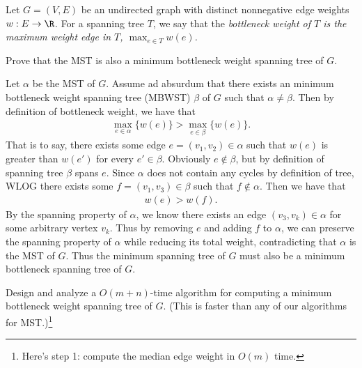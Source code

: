 \documentclass{article}
\begin{document}
 Let \( G=(V,E) \) be an undirected graph with distinct nonnegative edge weights \( w:E\to\R \).
For a spanning tree \( T \), we say that the \it{bottleneck weight of \( T \)} is the maximum weight edge in \( T \), \( \max_{e\in T} w(e) \).
\setcounter{section}{16}
\setcounter{exercise}{6}
\begin{subexercise}
Prove that the MST is also a minimum bottleneck weight spanning tree of \( G \).
\end{subexercise}
\begin{solution}
  Let \( \alpha \) be the MST of \( G \).
  Assume ad absurdum that there exists an minimum bottleneck weight spanning tree (MBWST) \( \beta \) of \( G \) such that \( \alpha \neq \beta \).
  Then by definition of bottleneck weight, we have that \begin{align*}
    \max\limits_{e\in \alpha}\{w(e)\} > \max\limits_{e\in \beta}\{w(e)\}.
  \end{align*}
  That is to say, there exists some edge \( e=(v_1, v_2)\in\alpha \) such that \( w(e) \) is greater than \( w(e') \) for every \( e'\in \beta \).
  Obviously \( e\not\in \beta \), but by definition of spanning tree \( \beta \) spans \( e \).
  Since \( \alpha \) does not contain any cycles by definition of tree, WLOG there exists some \( f=(v_1, v_3) \in \beta \) such that \( f\not\in\alpha \).
  Then we have that \begin{align*}
    w(e) > w(f).
  \end{align*}
  By the spanning property of \( \alpha \), we know there exists an edge \( (v_3,v_k)\in\alpha \) for some arbitrary vertex \( v_k \).
  Thus by removing \( e \) and adding \( f \) to \( \alpha \), we can preserve the spanning property of \( \alpha \) while reducing its total weight, contradicting that \( \alpha \) is the MST of \( G \).
  Thus the minimum spanning tree of \( G \) must also be a minimum bottleneck spanning tree of \( G \).
\end{solution}
\pagebreak

\begin{subexercise}
  Design and analyze a \( O(m + n) \)-time algorithm for computing a minimum
bottleneck weight spanning tree of \( G \).
(This is faster than any of our algorithms for MST.)\footnote[4]{Here's step 1: compute the median edge weight in \( O(m) \) time.}
\end{subexercise}
\end{document}
